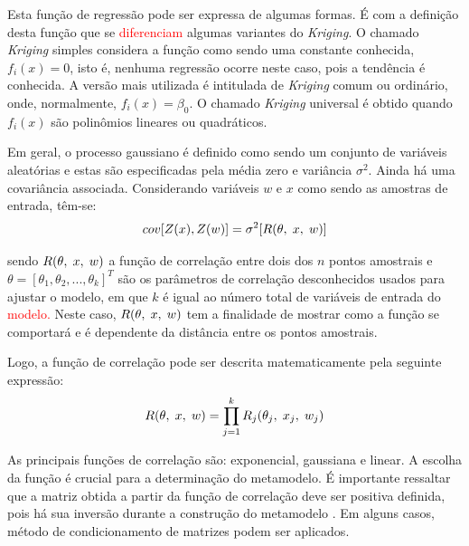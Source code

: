 Esta função de regressão pode ser expressa de algumas formas. É com a definição desta função que se \textcolor{red}{diferenciam} algumas variantes do {\it Kriging}. O chamado {\it Kriging} simples considera a função como sendo uma constante conhecida, $f_i(x)=0$, isto é, nenhuma regressão ocorre neste caso, pois a tendência é conhecida. A versão mais utilizada é intitulada de {\it Kriging} comum ou ordinário, onde, normalmente, $f_i(x)={\beta}_0$. O chamado {\it Kriging} universal é obtido quando $f_i(x)$ são polinômios lineares ou quadráticos. 

Em geral, o processo gaussiano é definido como sendo um conjunto de variáveis aleatórias e estas são especificadas pela média zero e variância ${\sigma}^2$. Ainda há uma covariância associada. Considerando variáveis $w$ e $x$ como sendo as amostras de entrada, têm-se:
\begin{equation}
cov[Z(x), Z(w)] = {\sigma^2}[R({\theta},\hspace{0.1 cm}x,\hspace{0.1 cm}w)]
\label{eq:14}
\end{equation}

\noindent sendo $R({\theta},\hspace{0.1 cm}x,\hspace{0.1 cm}w)$ a função de correlação entre dois dos $n$ pontos amostrais e $\theta=[{\theta}_1, {\theta}_2, ..., {\theta}_k]^T$ são os parâmetros de correlação desconhecidos usados para ajustar o modelo, em que $k$ é igual ao número total de variáveis de entrada do \textcolor{red}{modelo.} Neste caso, $R({\theta},\hspace{0.1 cm}x,\hspace{0.1 cm}w)$ tem a finalidade de mostrar como a função se comportará e é dependente da distância entre os pontos amostrais.  

Logo, a função de correlação pode ser descrita matematicamente pela seguinte expressão:
\begin{equation}
R({\theta},\hspace{0.1 cm}x,\hspace{0.1 cm}w) = \prod_{j=1}^k{{R}_j({\theta}_j,\hspace{0.1 cm}{x}_j,\hspace{0.1 cm}{w}_j)}
\label{eq:16}
\end{equation}

As principais funções de correlação são: exponencial, gaussiana e linear. A escolha da função é crucial para a determinação do metamodelo. É importante ressaltar que a matriz obtida a partir da função de correlação deve ser positiva definida, pois há sua inversão durante a construção do metamodelo \cite{KLEIJNEN2015, lophaven2002}. Em alguns casos, método de condicionamento de matrizes podem ser aplicados. 


